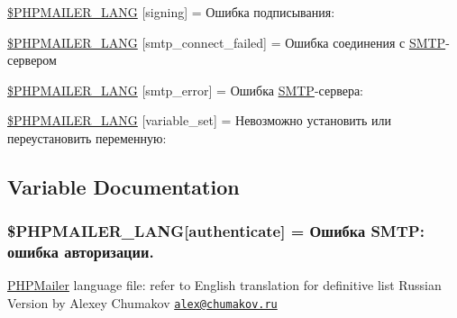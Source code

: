 \begin{DoxyCompactItemize}
\item 
\hyperlink{phpmailer_8lang-ru_8php_a68e437bdb9b968a5a67320f03d231565}{\$\+P\+H\+P\+M\+A\+I\+L\+E\+R\+\_\+\+L\+A\+NG} \mbox{[}\textquotesingle{}signing\textquotesingle{}\mbox{]} = \textquotesingle{}Ошибка подписывания\+: \textquotesingle{}
\item 
\hyperlink{phpmailer_8lang-ru_8php_a7b321d4ca1e9df702403ed4c61aa0980}{\$\+P\+H\+P\+M\+A\+I\+L\+E\+R\+\_\+\+L\+A\+NG} \mbox{[}\textquotesingle{}smtp\+\_\+connect\+\_\+failed\textquotesingle{}\mbox{]} = \textquotesingle{}Ошибка соединения с \hyperlink{class_s_m_t_p}{S\+M\+TP}-\/сервером\textquotesingle{}
\item 
\hyperlink{phpmailer_8lang-ru_8php_a7d9cffba1e669c845f8a4c891ee50064}{\$\+P\+H\+P\+M\+A\+I\+L\+E\+R\+\_\+\+L\+A\+NG} \mbox{[}\textquotesingle{}smtp\+\_\+error\textquotesingle{}\mbox{]} = \textquotesingle{}Ошибка \hyperlink{class_s_m_t_p}{S\+M\+TP}-\/сервера\+: \textquotesingle{}
\item 
\hyperlink{phpmailer_8lang-ru_8php_af795debc7a739d038742691c358d9032}{\$\+P\+H\+P\+M\+A\+I\+L\+E\+R\+\_\+\+L\+A\+NG} \mbox{[}\textquotesingle{}variable\+\_\+set\textquotesingle{}\mbox{]} = \textquotesingle{}Невозможно установить или переустановить переменную\+: \textquotesingle{}
\end{DoxyCompactItemize}


\subsection{Variable Documentation}
\subsubsection[{\texorpdfstring{\$\+P\+H\+P\+M\+A\+I\+L\+E\+R\+\_\+\+L\+A\+NG}{$PHPMAILER_LANG}}]{\setlength{\rightskip}{0pt plus 5cm}\$P\+H\+P\+M\+A\+I\+L\+E\+R\+\_\+\+L\+A\+NG\mbox{[}\textquotesingle{}authenticate\textquotesingle{}\mbox{]} = \textquotesingle{}Ошибка S\+M\+T\+P\+: ошибка авторизации.\textquotesingle{}}\hypertarget{phpmailer_8lang-ru_8php_a2cb33073c989b85580748e331ed8b4aa}{}\label{phpmailer_8lang-ru_8php_a2cb33073c989b85580748e331ed8b4aa}
\hyperlink{class_p_h_p_mailer}{P\+H\+P\+Mailer} language file\+: refer to English translation for definitive list Russian Version by Alexey Chumakov \href{mailto:alex@chumakov.ru}{\tt alex@chumakov.\+ru} 

